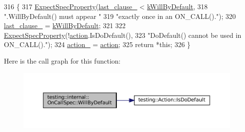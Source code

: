 \begin{DoxyCode}
316                                                      \{
317     \hyperlink{classtesting_1_1internal_1_1UntypedOnCallSpecBase_a7eeba49b7b2968ebb4859c04684828b2}{ExpectSpecProperty}(\hyperlink{classtesting_1_1internal_1_1UntypedOnCallSpecBase_adb6d19adfeb5fde535d854aedbc5fb0f}{last\_clause\_} < 
      \hyperlink{classtesting_1_1internal_1_1UntypedOnCallSpecBase_a78ebf16bfee40375e33a983f3100f354aeb25a21e1aa3dc4ca3a108b5533d7eed}{kWillByDefault},
318                        \textcolor{stringliteral}{".WillByDefault() must appear "}
319                        \textcolor{stringliteral}{"exactly once in an ON\_CALL()."});
320     \hyperlink{classtesting_1_1internal_1_1UntypedOnCallSpecBase_adb6d19adfeb5fde535d854aedbc5fb0f}{last\_clause\_} = \hyperlink{classtesting_1_1internal_1_1UntypedOnCallSpecBase_a78ebf16bfee40375e33a983f3100f354aeb25a21e1aa3dc4ca3a108b5533d7eed}{kWillByDefault};
321 
322     \hyperlink{classtesting_1_1internal_1_1UntypedOnCallSpecBase_a7eeba49b7b2968ebb4859c04684828b2}{ExpectSpecProperty}(!\hyperlink{namespaceupload_a675d13c979f1c720866d22ed1736f580}{action}.IsDoDefault(),
323                        \textcolor{stringliteral}{"DoDefault() cannot be used in ON\_CALL()."});
324     \hyperlink{classtesting_1_1internal_1_1OnCallSpec_a5868fd7eb5e314e9aef160ebfc9bf834}{action\_} = \hyperlink{namespaceupload_a675d13c979f1c720866d22ed1736f580}{action};
325     \textcolor{keywordflow}{return} *\textcolor{keyword}{this};
326   \}
\end{DoxyCode}
Here is the call graph for this function\+:
\nopagebreak
\begin{figure}[H]
\begin{center}
\leavevmode
\includegraphics[width=350pt]{classtesting_1_1internal_1_1OnCallSpec_a1c6303bf46983f20f4d2a61752fa8663_cgraph}
\end{center}
\end{figure}
\mbox{\label{classtesting_1_1internal_1_1OnCallSpec_a4d9152c0f74245670a1222aae2262d5e}} 
